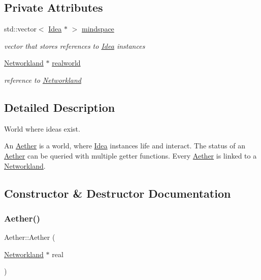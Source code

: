 \subsection*{Private Attributes}
\begin{DoxyCompactItemize}
\item 
std\+::vector$<$ \hyperlink{classIdea}{Idea} $\ast$ $>$ \hyperlink{classAether_ac58cc20fc4eddd732cfe22b2557060b1}{mindspace}
\begin{DoxyCompactList}\small\item\em vector that stores references to \hyperlink{classIdea}{Idea} instances \end{DoxyCompactList}\item 
\hyperlink{classNetworkland}{Networkland} $\ast$ \hyperlink{classAether_ad7e88c3d473a78ba840eab68adc06d04}{realworld}
\begin{DoxyCompactList}\small\item\em reference to \hyperlink{classNetworkland}{Networkland} \end{DoxyCompactList}\end{DoxyCompactItemize}


\subsection{Detailed Description}
World where ideas exist. 

An \hyperlink{classAether}{Aether} is a world, where \hyperlink{classIdea}{Idea} instances life and interact. The status of an \hyperlink{classAether}{Aether} can be queried with multiple getter functions. Every \hyperlink{classAether}{Aether} is linked to a \hyperlink{classNetworkland}{Networkland}. 

\subsection{Constructor \& Destructor Documentation}
\mbox{\label{classAether_adb65b2b9dec23ddd4b29c2cbe364b764}} 
\subsubsection{\texorpdfstring{Aether()}{Aether()}}
{\footnotesize\ttfamily Aether\+::\+Aether (\begin{DoxyParamCaption}\item[{\hyperlink{classNetworkland}{Networkland} $\ast$}]{real }\end{DoxyParamCaption})}



